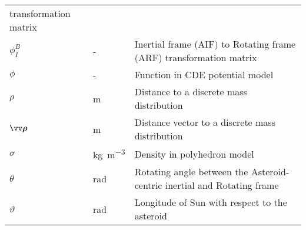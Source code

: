 \begin{longtable}[l]{p{100pt} p{70pt} p{250pt}}
                                            transformation matrix                           \\
    $\phi_{I}^{B}$      & -               & Inertial frame (AIF) to Rotating frame (ARF)
                                            transformation matrix                           \\
    $\phi$              & -               & Function in CDE potential model                 \\
    $\rho$              & m               & Distance to a discrete mass distribution        \\
    $\bvector{\rho}$    & m               & Distance vector to a discrete mass distribution \\
    $\sigma$            & \si{\kilo\gram\per\metre\cubed}        & Density in polyhedron model                     \\
    $\theta$            & rad             & Rotating angle between the Asteroid-centric
                                            inertial and Rotating frame                     \\
    $\vartheta$         & rad             & Longitude of Sun with respect to the asteroid   \\
\end{longtable}
\vspace{1cm}

